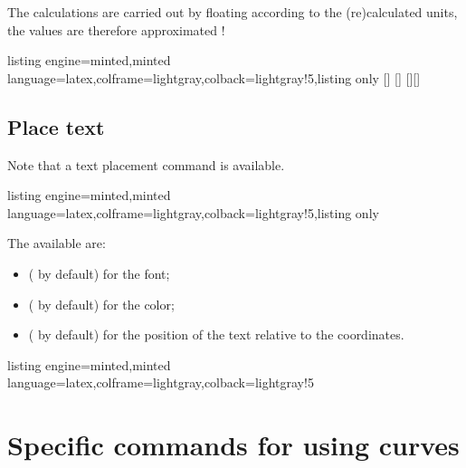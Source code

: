 \documentclass[11pt,a4paper]{ltxdoc}
\begin{document}
\smallskip

The calculations are carried out by floating according to the (re)calculated units, the values are therefore approximated !

\begin{tcblisting}{listing engine=minted,minted language=latex,colframe=lightgray,colback=lightgray!5,listing only}
[\macrox]
[\macroy]
[\macrox][\macroy]
\end{tcblisting}

\subsection{Place text}\label{placetxt}

Note that a text placement command is available.

\begin{tcblisting}{listing engine=minted,minted language=latex,colframe=lightgray,colback=lightgray!5,listing only}
\end{tcblisting}

The available \MontreCode{[keys]} are:

\begin{itemize}
	\item {} ( by default) for the font;
	\item {} ( by default) for the color;
	\item {} ( by default) for the position of the text relative to the coordinates.
\end{itemize}

\begin{tcblisting}{listing engine=minted,minted language=latex,colframe=lightgray,colback=lightgray!5}
\begin{GraphTikz}[x=1cm,y=1cm,Xmin=0,Xmax=5,Ymin=0,Ymax=1]
\end{GraphTikz}
\end{tcblisting}

\section{Specific commands for using curves}
\end{document}
